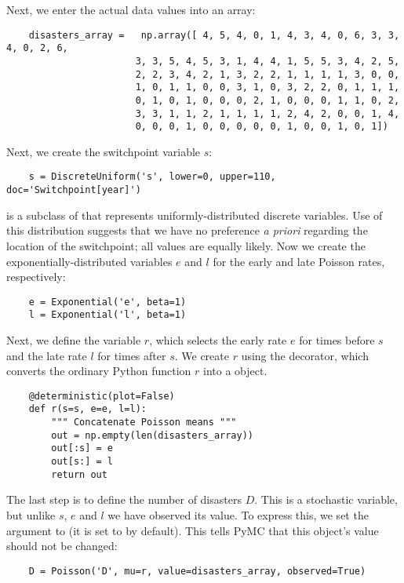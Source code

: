 Next, we enter the actual data values into an array:
\begin{verbatim}
	disasters_array =   np.array([ 4, 5, 4, 0, 1, 4, 3, 4, 0, 6, 3, 3, 4, 0, 2, 6,
	                   3, 3, 5, 4, 5, 3, 1, 4, 4, 1, 5, 5, 3, 4, 2, 5,
	                   2, 2, 3, 4, 2, 1, 3, 2, 2, 1, 1, 1, 1, 3, 0, 0,
	                   1, 0, 1, 1, 0, 0, 3, 1, 0, 3, 2, 2, 0, 1, 1, 1,
	                   0, 1, 0, 1, 0, 0, 0, 2, 1, 0, 0, 0, 1, 1, 0, 2,
	                   3, 3, 1, 1, 2, 1, 1, 1, 1, 2, 4, 2, 0, 0, 1, 4,
	                   0, 0, 0, 1, 0, 0, 0, 0, 0, 1, 0, 0, 1, 0, 1])
\end{verbatim}
Next, we create the switchpoint variable $s$:
\begin{verbatim}
	s = DiscreteUniform('s', lower=0, upper=110, doc='Switchpoint[year]')
\end{verbatim}
 is a subclass of  that represents uniformly-distributed discrete variables. Use of this distribution suggests that we have no preference \emph{a priori} regarding the location of the switchpoint; all values are equally likely. Now we create the exponentially-distributed variables $e$ and $l$ for the early and late Poisson rates, respectively:
\begin{verbatim}
	e = Exponential('e', beta=1)
	l = Exponential('l', beta=1)
\end{verbatim}
Next, we define the variable $r$, which selects the early rate $e$ for times before $s$ and the late rate $l$ for times after $s$. We create $r$ using the  decorator, which converts the ordinary Python function $r$ into a  object.
\begin{verbatim}
	@deterministic(plot=False)
	def r(s=s, e=e, l=l):
		""" Concatenate Poisson means """
	    out = np.empty(len(disasters_array))
	    out[:s] = e
	    out[s:] = l
	    return out
\end{verbatim}
The last step is to define the number of disasters $D$. This is a stochastic variable, but unlike $s$, $e$ and $l$ we have observed its value. To express this, we set the argument  to  (it is set to  by default). This tells PyMC that this object's value should not be changed:
\begin{verbatim}
	D = Poisson('D', mu=r, value=disasters_array, observed=True)
\end{verbatim}

